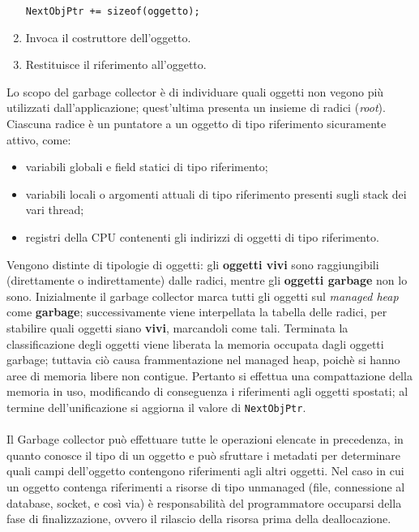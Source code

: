 \begin{solution}
\begin{enumerate}
\begin{center}
		\texttt{NextObjPtr += sizeof(oggetto);}

	\end{center}
	\item Invoca il costruttore dell'oggetto.
	\item Restituisce il riferimento all'oggetto.
\end{enumerate}
Lo scopo del garbage collector è di individuare quali oggetti non vegono più utilizzati dall'applicazione; quest'ultima presenta un insieme di radici (\textit{root}).
Ciascuna radice è un puntatore a un oggetto di tipo riferimento sicuramente attivo, come:
\begin{itemize}
	\item variabili globali e field statici di tipo riferimento;
	\item variabili locali o argomenti attuali di tipo riferimento presenti sugli stack dei vari thread;
	\item registri della CPU contenenti gli indirizzi di oggetti di tipo riferimento.
\end{itemize}
Vengono distinte di tipologie di oggetti: gli \textbf{oggetti vivi} sono raggiungibili (direttamente o indirettamente) dalle radici, mentre gli \textbf{oggetti garbage} non lo sono.
\newline
Inizialmente il garbage collector marca tutti gli oggetti sul \textit{managed heap} come \textbf{garbage}; successivamente viene interpellata la tabella delle radici, per stabilire quali oggetti siano \textbf{vivi}, marcandoli come tali.
\newline
Terminata la classificazione degli oggetti viene liberata la memoria occupata dagli oggetti garbage; tuttavia ciò causa frammentazione nel managed heap, poichè si hanno aree di memoria libere non contigue.
Pertanto si effettua una compattazione della memoria in uso, modificando di conseguenza i riferimenti agli oggetti spostati; al termine dell'unificazione si aggiorna il valore di \texttt{NextObjPtr}.
\\\\
Il Garbage collector può effettuare tutte le operazioni elencate in precedenza, in quanto conosce il tipo di un oggetto e può sfruttare i metadati per determinare quali campi dell'oggetto contengono riferimenti agli altri oggetti.
\newline
Nel caso in cui un oggetto contenga riferimenti a risorse di tipo unmanaged (file, connessione al database, socket, e così via) è responsabilità del programmatore occuparsi della fase di finalizzazione, ovvero il rilascio della risorsa prima della deallocazione.
\end{solution}



